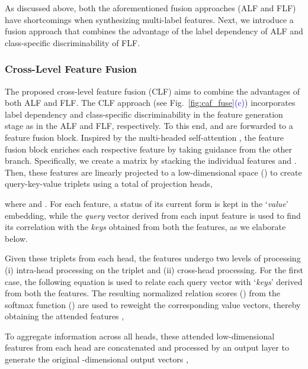 \documentclass[10pt,journal,compsoc]{IEEEtran}
\newcommand{\highlight}[1]{\textcolor{blue}{#1}}
\begin{document}
As discussed above, both the aforementioned fusion approaches (ALF and FLF) have shortcomings when synthesizing multi-label features. Next, we introduce a fusion approach that combines the advantage of the label dependency of ALF and class-specific discriminability of FLF. 



















\subsubsection{Cross-Level Feature Fusion}
\label{sec:cross_fuse}
The proposed cross-level feature fusion (CLF) aims to combine the advantages of both ALF and FLF. The CLF approach (see Fig.~\ref{fig:caf_fuse}\highlight{(c)}) incorporates label dependency and class-specific discriminability in the feature generation stage as in the ALF and FLF, respectively. 
To this end,  and  are forwarded to a feature fusion block. Inspired by the multi-headed self-attention \cite{vaswani2017attention}, the feature fusion block enriches each respective feature by taking guidance from the other branch. Specifically, we create a matrix  by stacking the individual features  and . Then,  these features are linearly projected to a low-dimensional space () to create query-key-value triplets using a total of  projection heads,

where  and  . For each feature, a status of its current form is kept in the `\emph{value}' embedding, while the \emph{query} vector derived from each input feature is used to find its correlation with the \emph{keys} obtained from both the features, as we elaborate below.

Given these triplets from each head, the features undergo two levels of processing (i) intra-head processing on the triplet and (ii) cross-head processing. For the first case, the following equation is used to relate each query vector with `\emph{keys}' derived from both the features. The resulting normalized relation scores () from the softmax function () are used to reweight the corresponding value vectors, thereby obtaining the attended features , 

To aggregate information across all heads, these attended low-dimensional features from each head are concatenated and processed by an output layer to generate the original -dimensional output vectors , 
\end{document}
